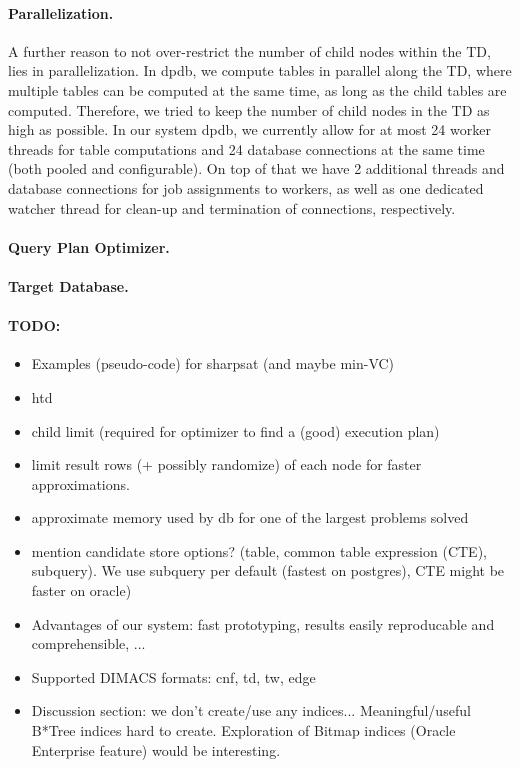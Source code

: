 \documentclass{llncs}
\newcommand{\dpdb}{{\small\textsf{dpdb}}\xspace}
\begin{document}
\paragraph*{Parallelization.} A further reason to not over-restrict the number of child nodes within the TD, lies in parallelization.
In \dpdb, we compute tables in parallel along the TD,
where multiple tables can be computed at the same time,
as long as the child tables are computed.
Therefore, we tried to keep the number of child nodes in the TD as high as possible.
In our system \dpdb, we currently allow 
for at most 24 worker threads for table computations and 24 database connections at the same time (both pooled and configurable).
On top of that we have 2 additional threads and database connections for job assignments to workers, as well as one dedicated watcher thread for clean-up and termination of connections, respectively.



\paragraph*{Query Plan Optimizer.}


\paragraph*{Target Database.}


\paragraph*{TODO:}
\begin{itemize}
	\item Examples (pseudo-code) for sharpsat (and maybe min-VC)
	\item htd
	\item child limit (required for optimizer to find a (good) execution plan)
	\item limit result rows (+ possibly randomize) of each node for faster approximations.
	\item approximate memory used by db for one of the largest problems solved
	\item mention candidate store options? (table, common table expression (CTE), subquery). We use subquery per default (fastest on postgres), CTE might be faster on oracle)
	\item Advantages of our system: fast prototyping, results easily reproducable and comprehensible, ...
	\item Supported DIMACS formats: cnf, td, tw, edge
	\item Discussion section: we don't create/use any indices... Meaningful/useful B*Tree indices hard to create. Exploration of Bitmap indices (Oracle Enterprise feature) would be interesting.
\end{itemize}
\end{document}
